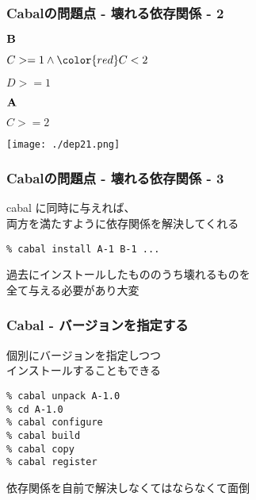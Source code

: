 \documentclass[cjk,dvipdfm,14pt]{beamer}
\begin{document}
\begin{frame}
\frametitle{Cabalの問題点 - 壊れる依存関係 - 2}

\begin{description}
\item ${\bf B}$
\item
  \begin{description}
  \item $C >= 1 \wedge {\color{red} C < 2}$
  \item $D >= 1$
  \end{description}
\end{description}

\begin{description}
\item ${\bf A}$
\item
  \begin{description}
  \item $C >= 2$
  \end{description}
\end{description}

\texttt{[image: ./dep21.png]}

\end{frame}

\begin{frame}[fragile]
\frametitle{Cabalの問題点 - 壊れる依存関係 - 3}

cabal に同時に与えれば、\\両方を満たすように依存関係を解決してくれる

\begin{lstlisting}
% cabal install A-1 B-1 ...
\end{lstlisting}

過去にインストールしたもののうち壊れるものを\\全て与える必要があり大変

\end{frame}


\begin{frame}[fragile]
\frametitle{Cabal - バージョンを指定する}

個別にバージョンを指定しつつ\\インストールすることもできる

\begin{lstlisting}
% cabal unpack A-1.0
% cd A-1.0
% cabal configure
% cabal build
% cabal copy
% cabal register
\end{lstlisting}

依存関係を自前で解決しなくてはならなくて面倒

\end{frame}
\end{document}
